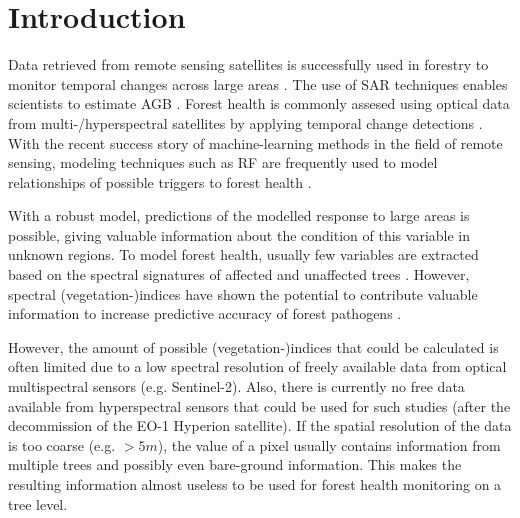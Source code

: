 \documentclass[review]{elsarticle}
\begin{document}
\section{Introduction}
\label{sec:intro}

Data retrieved from remote sensing satellites is successfully used in forestry to monitor temporal changes across large areas \citep{martinezdelcastilloEvaluationForestCover2015,sextonModelPropagationUncertainty2015}.
The use of \ac{SAR} techniques enables scientists to estimate \ac{AGB} \citep{luSurveyRemoteSensingbased2016, sinhaReviewRadarRemote2015}.
Forest health is commonly assesed using optical data from multi-/hyperspectral satellites by applying temporal change detections \citep{zhangRemoteSensingSeasonal2016}.
With the recent success story of machine-learning methods in the field of remote sensing, modeling techniques such as \ac{RF} are frequently used to model relationships of possible triggers to forest health \citep{belgiuRandomForestRemote2016, laryMachineLearningGeosciences2016, michezClassificationRiparianForest2016}.

With a robust model, predictions of the modelled response to large areas is possible, giving valuable information about the condition of this variable in unknown regions.
To model forest health, usually few variables are extracted based on the spectral signatures of affected and unaffected trees \citep{lelongEvaluationOilPalmFungal2010}.
However, spectral (vegetation-)indices have shown the potential to contribute valuable information to increase predictive accuracy of forest pathogens \citep{jiangSatellitederivedVegetationIndices2014, adamczykRededgeVegetationIndices2015}.

However, the amount of possible (vegetation-)indices that could be calculated is often limited due to a low spectral resolution of freely available data from optical multispectral sensors (e.g. Sentinel-2).
Also, there is currently no free data available from hyperspectral sensors that could be used for such studies (after the decommission of the EO-1 Hyperion satellite).
If the spatial resolution of the data is too coarse (e.g. $> 5 m$), the value of a pixel usually contains information from multiple trees and possibly even bare-ground information.
This makes the resulting information almost useless to be used for forest health monitoring on a tree level.

\end{document}
